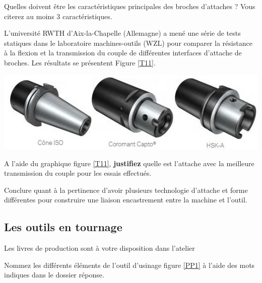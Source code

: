 \documentclass[12pt]{article}
\newcounter{exo}
\newenvironment{exo}{\stepcounter{exo}\vspace{0.5cm}{\bfseries Question \theexo\ :}}{\par\vspace{0.5cm}}
\begin{document}
\begin{exo} Quelles doivent être les caractéristiques principales des broches d'attaches ? Vous citerez au moins 3 caractéristiques.\end{exo}



L'université RWTH d'Aix-la-Chapelle (Allemagne) a mené une série de tests statiques dans le laboratoire machines-outils (WZL) pour comparer la résistance à la flexion et la transmission du couple de différentes interfaces d'attache de broches. Les résultats se présentent Figure \ref{T11}.

\includegraphics[width=0.9\linewidth]{Images/cone1.JPG}


\begin{exo} A l’aide du graphique figure \ref{T11}, \textbf{justifiez} quelle est l’attache avec la meilleure transmission du couple pour les essais effectués. \end{exo}



\begin{exo} Conclure quant à la pertinence d'avoir plusieurs technologie d'attache et forme différentes pour construire une liaison encastrement entre la machine et l'outil.
\end{exo}

\subsection{Les outils en tournage}


\begin{tcolorbox}[colback=blue!5!white,colframe=red!75!black]
  \bcinfo Les livres de production sont à votre disposition dans l'atelier
\end{tcolorbox}

\begin{exo} Nommez les différents éléments de l’outil d’usinage figure \ref{PP1} à l'aide des mots
indiques dans le dossier réponse. \end{exo}
\end{document}

